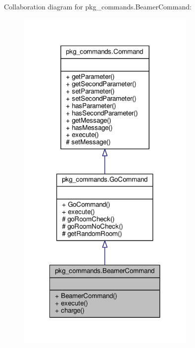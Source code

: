Collaboration diagram for pkg\-\_\-commands.\-Beamer\-Command\-:
\nopagebreak
\begin{figure}[H]
\begin{center}
\leavevmode
\includegraphics[width=246pt]{classpkg__commands_1_1BeamerCommand__coll__graph}
\end{center}
\end{figure}
